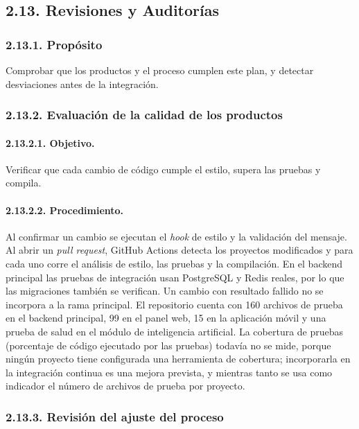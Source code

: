 \subsection{2.13. Revisiones y Auditorías}

\subsubsection{2.13.1. Propósito}

Comprobar que los productos y el proceso cumplen este plan, y detectar desviaciones antes de la integración.

\subsubsection{2.13.2. Evaluación de la calidad de los productos}

\paragraph{2.13.2.1. Objetivo.}

Verificar que cada cambio de código cumple el estilo, supera las pruebas y compila.

\paragraph{2.13.2.2. Procedimiento.}

Al confirmar un cambio se ejecutan el \textit{hook} de estilo y la validación del mensaje. Al abrir un \textit{pull request}, GitHub Actions detecta los proyectos modificados y para cada uno corre el análisis de estilo, las pruebas y la compilación. En el backend principal las pruebas de integración usan PostgreSQL y Redis reales, por lo que las migraciones también se verifican. Un cambio con resultado fallido no se incorpora a la rama principal. El repositorio cuenta con 160 archivos de prueba en el backend principal, 99 en el panel web, 15 en la aplicación móvil y una prueba de salud en el módulo de inteligencia artificial. La cobertura de pruebas (porcentaje de código ejecutado por las pruebas) todavía no se mide, porque ningún proyecto tiene configurada una herramienta de cobertura; incorporarla en la integración continua es una mejora prevista, y mientras tanto se usa como indicador el número de archivos de prueba por proyecto.

\subsubsection{2.13.3. Revisión del ajuste del proceso}

